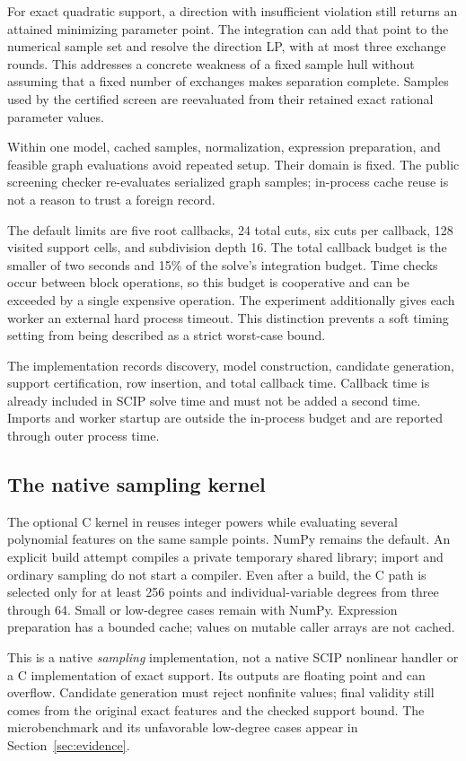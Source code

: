 For exact quadratic support, a direction with insufficient violation
still returns an attained minimizing parameter point. The integration
can add that point to the numerical sample set and resolve the
direction LP, with at most three exchange rounds. This addresses a
concrete weakness of a fixed sample hull without assuming that a
fixed number of exchanges makes separation complete. Samples used
by the certified screen are reevaluated from their retained exact
rational parameter values.

Within one model, cached samples, normalization, expression
preparation, and feasible graph evaluations avoid repeated setup.
Their domain is fixed. The public screening checker re-evaluates
serialized graph samples; in-process cache reuse is not a reason to
trust a foreign record.

The default limits are five root callbacks, 24 total cuts, six cuts
per callback, 128 visited support cells, and subdivision depth 16.
The total callback budget is the smaller of two seconds and 15\% of
the solve's integration budget. Time checks occur between block
operations, so this budget is cooperative and can be exceeded by a
single expensive operation. The experiment additionally gives each
worker an external hard process timeout. This distinction prevents a
soft timing setting from being described as a strict worst-case bound.

The implementation records discovery, model construction, candidate
generation, support certification, row insertion, and total callback
time. Callback time is already included in SCIP solve time and must
not be added a second time. Imports and worker startup are outside the
in-process budget and are reported through outer process time.

\subsection{The native sampling kernel}

The optional C kernel in
reuses integer powers while evaluating several polynomial features on
the same sample points. NumPy remains the default. An explicit build
attempt compiles a private temporary shared library; import and ordinary
sampling do not start a compiler. Even after a build, the C path is
selected only for at least 256 points and individual-variable degrees
from three through 64. Small or low-degree cases remain with NumPy.
Expression preparation has a bounded cache; values on mutable caller
arrays are not cached.

This is a native \emph{sampling} implementation, not a native SCIP
nonlinear handler or a C implementation of exact support. Its outputs
are floating point and can overflow. Candidate generation must reject
nonfinite values; final validity still comes from the original exact
features and the checked support bound. The microbenchmark and its
unfavorable low-degree cases appear in Section~\ref{sec:evidence}.
